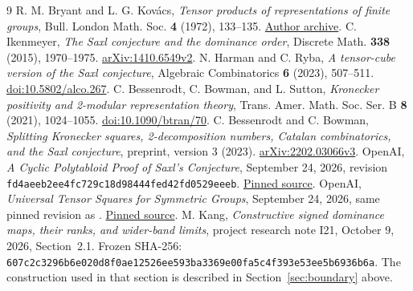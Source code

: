 \begingroup\raggedright
\begin{thebibliography}{9}
 R. M. Bryant and L. G. Kov\'acs,
\emph{Tensor products of representations of finite groups},
Bull. London Math. Soc. \textbf{4} (1972), 133--135.
\href{https://archives.maths.anu.edu.au/people/Kovacs/K033.pdf}{Author archive}.
 C. Ikenmeyer,
\emph{The Saxl conjecture and the dominance order},
Discrete Math. \textbf{338} (2015), 1970--1975.
\href{https://arxiv.org/abs/1410.6549v2}{arXiv:1410.6549v2}.
 N. Harman and C. Ryba,
\emph{A tensor-cube version of the Saxl conjecture},
Algebraic Combinatorics \textbf{6} (2023), 507--511.
\href{https://doi.org/10.5802/alco.267}{doi:10.5802/alco.267}.
 C. Bessenrodt, C. Bowman, and L. Sutton,
\emph{Kronecker positivity and 2-modular representation theory},
Trans. Amer. Math. Soc. Ser. B \textbf{8} (2021), 1024--1055.
\href{https://doi.org/10.1090/btran/70}{doi:10.1090/btran/70}.
 C. Bessenrodt and C. Bowman,
\emph{Splitting Kronecker squares, 2-decomposition numbers, Catalan combinatorics, and the Saxl conjecture}, preprint, version 3 (2023).
\href{https://arxiv.org/abs/2202.03066v3}{arXiv:2202.03066v3}.
 OpenAI,
\emph{A Cyclic Polytabloid Proof of Saxl's Conjecture}, September 24, 2026,
revision \texttt{fd4aeeb2ee4f}\allowbreak\texttt{c729c18d98444fed42fd0529eeeb}.
\href{https://github.com/openai/math/tree/fd4aeeb2ee4fc729c18d98444fed42fd0529eeeb/preprints/A-Cyclic-Polytabloid-Proof-of-Saxls-Conjecture-September-24-2026}{Pinned source}.
 OpenAI,
\emph{Universal Tensor Squares for Symmetric Groups}, September 24, 2026,
same pinned revision as \cite{OAI}.
\href{https://github.com/openai/math/tree/fd4aeeb2ee4fc729c18d98444fed42fd0529eeeb/preprints/Universal-Tensor-Squares-for-Symmetric-Groups-September-24-2026}{Pinned source}.
 M. Kang,
\emph{Constructive signed dominance maps, their ranks, and wider-band limits},
project research note I21, October 9, 2026, Section~2.1.
Frozen SHA-256: \texttt{607c2c3296b6e020d8f0ae12526ee593}\allowbreak\texttt{ba3369e00fa5c4f393e53ee5b6936b6a}.
The construction used in that section is described in Section~\ref{sec:boundary} above.
\end{thebibliography}
\endgroup
